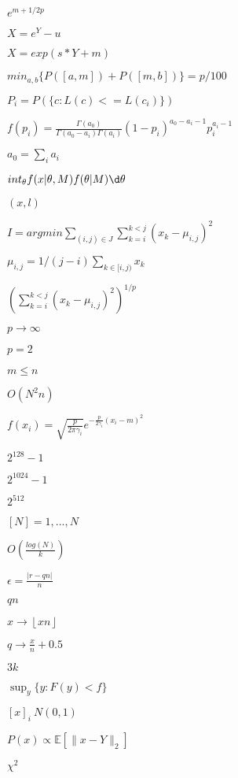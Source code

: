 \documentclass{article}
\begin{document}
{{{$e^{m + 1 / 2 p}$
\pagebreak

$X = e^Y - u$
\pagebreak

$X = exp(s * Y + m)$
\pagebreak

$min_{a,b}\{P([a,m]) + P([m,b])\} = p / 100$
\pagebreak

$P_i = P(\{c : L(c) <= L(c_i)\})$
\pagebreak

$\displaystyle f(p_i) = \frac{\Gamma(a_0)}{\Gamma(a_0 - a_i)\Gamma(a_i)}(1 - p_i)^{a_0-a_i-1}p_i^{a_i-1}$
\pagebreak

$\displaystyle a_0 = \sum_i{a_i}$
\pagebreak

$int_{\theta}f(x|\theta, M)f(\theta|M)\d\theta$
\pagebreak

$(x,l)$
\pagebreak

$\displaystyle I=argmin{\sum_{(i,j)\in J}\sum_{k=i}^{k<j}{(x_k-\mu_{i,j})^2}}$
\pagebreak

$\mu_{i,j}=1/(j-i)\sum_{k\in[i,j)}{x_k}$
\pagebreak

$\displaystyle {(\sum_{k=i}^{k<j}{(x_k-\mu_{i,j})^2})^{1/p}}$
\pagebreak

$p\rightarrow\infty$
\pagebreak

$p = 2$
\pagebreak

$m \leq n$
\pagebreak

$O(N^2n)$
\pagebreak

$\displaystyle f(x_i) = \sqrt{\frac{p}{2\pi\gamma_i}} e^{-\frac{p}{2\gamma_i}(x_i - m)^2}$
\pagebreak

$2^{128}-1$
\pagebreak

$2^{1024}-1$
\pagebreak

$2^{512}$
\pagebreak

$[N] = {1,...,N}$
\pagebreak

$\displaystyle O(\frac{log(N)}{k})$
\pagebreak

$\displaystyle \epsilon = \frac{|r - qn|}{n}$
\pagebreak

$qn$
\pagebreak

$\displaystyle x \rightarrow \left \lfloor xn \right \rfloor$
\pagebreak

$\displaystyle q \rightarrow \frac{x}{n} + 0.5$
\pagebreak

$3k$
\pagebreak

$\sup_y{\{y:F(y)<f\}}$
\pagebreak

$[x]_i ~ N(0,1)$
\pagebreak

$\displaystyle P(x) \propto \mathbb{E}\left[ \|x - Y\|_2 \right]$
\pagebreak

$\chi^2$
\pagebreak

}}}
\end{document}
